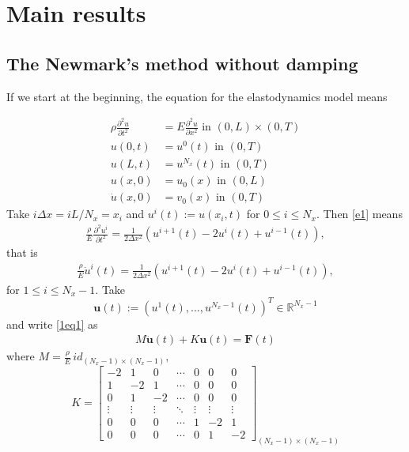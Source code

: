 \documentclass[a4paper, 10pt]{article}
\begin{document}
\section{Main results}



\subsection{The Newmark's method without damping}


If we start at the beginning, the equation for the elastodynamics model means

\begin{align}
\rho \frac{\partial^2 u}{\partial t^2} & = E  \frac{\partial^2 u}{\partial x^2} \text{ in } (0,L) \times (0,T) \label{e1}\\
u(0,t) & = u^0(t) \text{ in } (0,T) \label{e2}\\
u(L,t) & = u^{N_x}(t)  \text{ in } (0,T) \label{e3} \\
u(x,0) & = u_0(x)  \text{ in } (0,L) \label{e4}\\
\dot{u}(x,0) &  = v_0(x)  \text{ in } (0,T) \label{e5}
\end{align}
Take $i\Delta x = i L/N_x = x_i$ and $u^{i}(t):=u(x_i,t)$  for $0 \le i \le N_x.$ Then \eqref{e1} means
\begin{align}
\frac{\rho}{E} \frac{\partial^2 u^i}{\partial t^2}  = \frac{1}{2\Delta x^2} \left(u^{i+1}(t) -2u^i(t)+u^{i-1}(t)\right),
\end{align}
that is
\begin{align}
\frac{\rho}{E} \ddot{u}^i(t)  = \frac{1}{2\Delta x^2} \left(u^{i+1}(t) -2u^i(t)+u^{i-1}(t)\right), \label{1eq1}
\end{align}
for $1 \le i \le N_x-1.$ Take
$$
\mathbf{u}(t):=(u^1(t),\ldots,u^{N_x-1}(t))^T \in \mathbb{R}^{N_x-1}
$$
and write \eqref{1eq1} as
\begin{align}
M \ddot{\mathbf{u}}(t)  + K \mathbf{u}(t) = \mathbf{F}(t) \label{Peq}
\end{align}
where $M = \frac{\rho}{E} \, id_{(N_x-1) \times (N_x-1)},$ 
$$
K = \left[
\begin{array}{ccccccc}
-2 & 1 & 0 & \cdots & 0 & 0 & 0 \\
1 & -2 & 1 & \cdots & 0 & 0 & 0 \\
0 & 1 & -2 & \cdots & 0 & 0 & 0 \\
\vdots & \vdots & \vdots & \ddots & \vdots & \vdots & \vdots \\
0 & 0 & 0 & \cdots & 1 & -2 & 1 \\
0 & 0 & 0 & \cdots & 0 & 1 & -2
\end{array}
\right]_{(N_x-1) \times (N_x-1)}
$$
\end{document}
